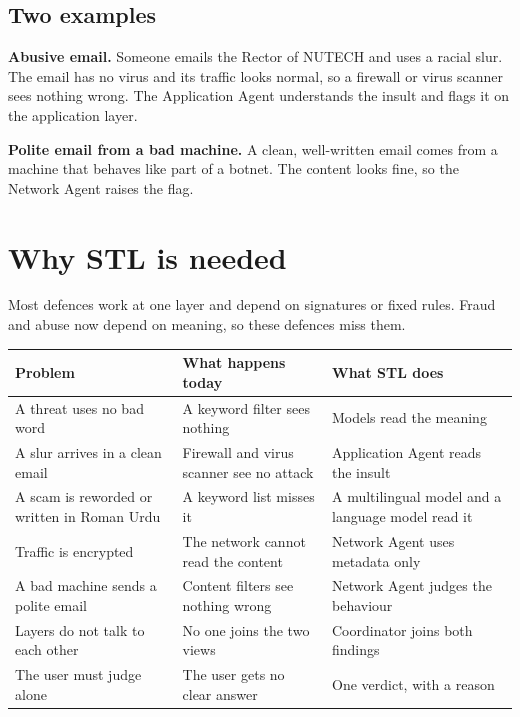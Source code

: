 \documentclass[11pt,a4paper]{article}
\newcommand{\need}[1][10]{\Needspace{#1\baselineskip}}
\begin{document}
\subsection*{Two examples}

\textbf{Abusive email.} Someone emails the Rector of NUTECH and uses a racial slur. The email has no virus and its traffic looks normal, so a firewall or virus scanner sees nothing wrong. The Application Agent understands the insult and flags it on the application layer.

\textbf{Polite email from a bad machine.} A clean, well-written email comes from a machine that behaves like part of a botnet. The content looks fine, so the Network Agent raises the flag.

\need[25]
\section{Why STL is needed}

Most defences work at one layer and depend on signatures or fixed rules. Fraud and abuse now depend on meaning, so these defences miss them.

\begin{center}
\begin{tabularx}{\linewidth}{P{4.3cm}YY}
\toprule
\textbf{Problem} & \textbf{What happens today} & \textbf{What STL does} \\
\midrule
A threat uses no bad word & A keyword filter sees nothing & Models read the meaning \\
A slur arrives in a clean email & Firewall and virus scanner see no attack & Application Agent reads the insult \\
A scam is reworded or written in Roman Urdu & A keyword list misses it & A multilingual model and a language model read it \\
Traffic is encrypted & The network cannot read the content & Network Agent uses metadata only \\
A bad machine sends a polite email & Content filters see nothing wrong & Network Agent judges the behaviour \\
Layers do not talk to each other & No one joins the two views & Coordinator joins both findings \\
The user must judge alone & The user gets no clear answer & One verdict, with a reason \\
\bottomrule
\end{tabularx}
\end{center}
\end{document}
